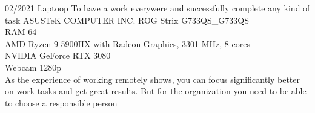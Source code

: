 

\begin{entrylist}
    \entry
    {02/2021}
    {Laptoop}
    {To have a work everywere and successfully complete any kind of task}
    {
        ASUSTeK COMPUTER INC. ROG Strix G733QS\_G733QS             \\
        RAM 64                                                     \\
        AMD Ryzen 9 5900HX with Radeon Graphics, 3301 MHz, 8 cores \\
    NVIDIA GeForce RTX 3080                                    \\
    Webcam 1280p\\

    As the experience of working remotely shows, you can focus significantly better on work tasks and get great results.
    But for the organization you need to be able to choose a responsible person
    }
\end{entrylist}
